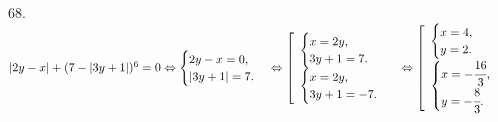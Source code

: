 68. $|2y-x|+(7-|3y+1|)^6=0 \Leftrightarrow \begin{cases} 2y-x=0,\\ |3y+1|=7.\end{cases}\Leftrightarrow
\left[\begin{array}{l}\begin{cases} x=2y,\\ 3y+1=7.\end{cases}\\
\begin{cases} x=2y,\\ 3y+1=-7.\end{cases}\end{array}\right.\Leftrightarrow
\left[\begin{array}{l}\begin{cases} x=4,\\ y=2.\end{cases}\\
\begin{cases} x=-\cfrac{16}{3},\\ y=-\cfrac{8}{3}.\end{cases}\end{array}\right.$\\
